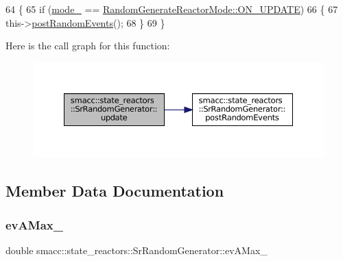 \begin{DoxyCode}
64 \{
65     \textcolor{keywordflow}{if} (\hyperlink{classsmacc_1_1state__reactors_1_1SrRandomGenerator_a10984da2fb51badf4fe6f25861120735}{mode\_} == \hyperlink{namespacesmacc_1_1state__reactors_a038f8e362ad6d35494c940ee4c97a52ea4a6be4c8602d150038b100a35556d3d7}{RandomGenerateReactorMode::ON\_UPDATE})
66     \{
67         this->\hyperlink{classsmacc_1_1state__reactors_1_1SrRandomGenerator_a50638c93ca9444fbeecea6e72bc6ac35}{postRandomEvents}();
68     \}
69 \}
\end{DoxyCode}
Here is the call graph for this function\+:
\nopagebreak
\begin{figure}[H]
\begin{center}
\leavevmode
\includegraphics[width=350pt]{classsmacc_1_1state__reactors_1_1SrRandomGenerator_adf6e20208210f30639b92214e1dda83b_cgraph}
\end{center}
\end{figure}


\subsection{Member Data Documentation}
\mbox{\label{classsmacc_1_1state__reactors_1_1SrRandomGenerator_ad5148909923e6761c7de33749f324609}} 
\subsubsection{\texorpdfstring{ev\+A\+Max\+\_\+}{evAMax\_}}
{\footnotesize\ttfamily double smacc\+::state\+\_\+reactors\+::\+Sr\+Random\+Generator\+::ev\+A\+Max\+\_\+\hspace{0.3cm}{\ttfamily [private]}}



